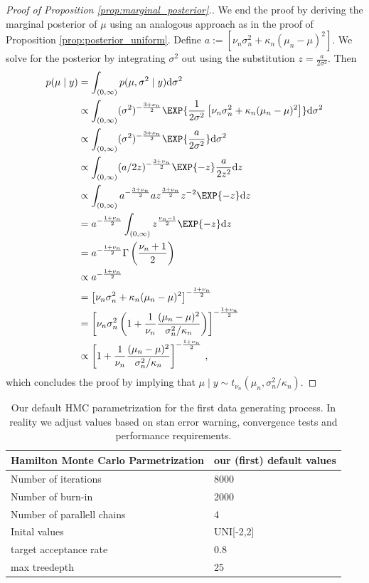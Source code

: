 \begin{proof}[Proof of Proposition \ref{prop:marginal_posterior}.]
We end the proof by deriving the marginal posterior of $\mu$ using an analogous approach as in the proof of Proposition \ref{prop:posterior_uniform}.
Define $a := \left[\nu_n\sigma_n^2 + \kappa_n(\mu_n - \mu)^2 \right]$. We solve for the posterior by integrating $\sigma^2$ out using the substitution $z = \frac{a}{2\sigma^2}$. Then
\begin{align*}
  p(\mu \mid y) &= \int_{(0, \infty)} p(\mu, \sigma^2 \mid y) \mathrm{d}\sigma^2\\
  &\propto \int_{(0, \infty)}(\sigma^2)^{-\frac{3 + \nu_n}{2}} \EXP{\frac{1}{2\sigma^2} \left[\nu_n \sigma_n^2 + \kappa_n(\mu_n - \mu)^2 \right]}\mathrm{d}\sigma^2\\
  &\propto \int_{(0, \infty)}(\sigma^2)^{-\frac{3 + \nu_n}{2}} \EXP{\frac{a}{2\sigma^2}}\mathrm{d}\sigma^2\\
  &\propto \int_{(0, \infty)}(a / 2z)^{-\frac{3 + \nu_n}{2}} \EXP{-z} \frac{a}{2 z^2} \mathrm{d}z\\
  &\propto \int_{(0, \infty)}a^{-\frac{3 + \nu_n}{2}}a z^{\frac{3 + \nu_n}{2}}z^{-2} \EXP{-z} \mathrm{d}z\\
  &= a^{-\frac{1 + \nu_n}{2}} \int_{(0, \infty)} z^{\frac{\nu_n - 1}{2}} \EXP{-z} \mathrm{d}z\\
  &= a^{-\frac{1 + \nu_n}{2}} \Gamma\left(\frac{\nu_n + 1}{2}\right)\\
  &\propto a^{-\frac{1 + \nu_n}{2}}\\
  &= \left[\nu_n \sigma_n^2 + \kappa_n(\mu_n - \mu)^2 \right]^{-\frac{1 + \nu_n}{2}}\\
  &= \left[\nu_n \sigma_n^2\left(1 + \frac{1}{\nu_n}\frac{(\mu_n - \mu)^2}{\sigma_n^2 / \kappa_n}\right) \right]^{-\frac{1 + \nu_n}{2}}\\
  &\propto \left[1 + \frac{1}{\nu_n}\frac{(\mu_n - \mu)^2}{\sigma_n^2 / \kappa_n} \right]^{-\frac{1 + \nu_n}{2}} \,,
\end{align*}
which concludes the proof by implying that $\mu \mid y \sim t_{\nu_n}(\mu_n, \sigma_n^2 / \kappa_n)$.
\end{proof}


\begin{table}[!ht]
\begin{center}
\begin{tabular}{l l}
Hamilton Monte Carlo Parmetrization & our (first) default values\\
\hline
Number of iterations &8000  \\
Number of burn-in & 2000  \\
Number of parallell chains & 4  \\
Inital values & UNI[-2,2]  \\
target acceptance rate & 0.8  \\
max treedepth & 25 \\
\end{tabular}
\end{center}
\caption{Our default HMC parametrization for the first data generating process. In reality we adjust values based on stan error warning, convergence tests and performance requirements.}
\label{tab:default_1}
\end{table}



